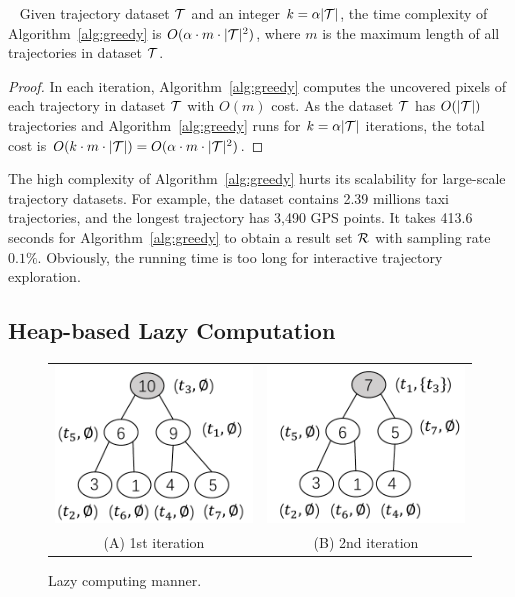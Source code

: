 \begin{lemma}~\label{lem:cost}
	Given trajectory dataset $\mathcal{T}$ and an integer $k = \alpha |\mathcal{T}|$, the time complexity of Algorithm~\ref{alg:greedy} is $O(\alpha \cdot m \cdot |\mathcal{T}|^2)$, where $m$ is the maximum length of all trajectories in dataset $\mathcal{T}$.
\end{lemma}


\begin{proof}
	In each iteration,
	Algorithm~\ref{alg:greedy} computes the uncovered pixels of each trajectory in dataset $\mathcal{T}$ with $O(m)$ cost.
	As the dataset $\mathcal{T}$ has $O(|\mathcal{T}|)$ trajectories and Algorithm~\ref{alg:greedy} runs for $k = \alpha |\mathcal{T}|$ iterations, the total cost is $O(k \cdot m \cdot |\mathcal{T}|)=O(\alpha \cdot m \cdot |\mathcal{T}|^2)$.
\end{proof}


The high complexity of Algorithm~\ref{alg:greedy} hurts its scalability for large-scale trajectory datasets. For example, the \pt{} dataset contains 2.39 millions taxi trajectories, and the longest trajectory has 3,490 GPS points.
It takes 413.6 seconds for Algorithm~\ref{alg:greedy} to obtain a result set $\mathcal{R}$ with sampling rate $0.1\%$.    Obviously, the running time is too long for interactive trajectory exploration.

\subsection{Heap-based Lazy Computation}\label{sec:opt}




\begin{figure}
	\centering
	\small
	\begin{tabular}{cc}
		\includegraphics[width=0.35\columnwidth]{pictures/1st}
		&
		\includegraphics[width=0.35\columnwidth]{pictures/2nd}
		\\
		(A) 1st iteration
		&
		(B) 2nd iteration
	\end{tabular}
	\caption{Lazy computing manner.} \label{fig:heap} %
\end{figure}







